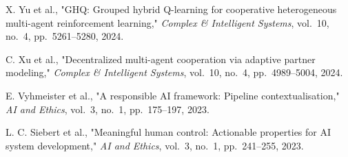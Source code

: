 X. Yu et al., "GHQ: Grouped hybrid Q-learning for cooperative heterogeneous multi-agent reinforcement learning," \textit{Complex \& Intelligent Systems}, vol.~10, no.~4, pp.~5261--5280, 2024.

C. Xu et al., "Decentralized multi-agent cooperation via adaptive partner modeling," \textit{Complex \& Intelligent Systems}, vol.~10, no.~4, pp.~4989--5004, 2024.

E. Vyhmeister et al., "A responsible AI framework: Pipeline contextualisation," \textit{AI and Ethics}, vol.~3, no.~1, pp.~175--197, 2023.

L. C. Siebert et al., "Meaningful human control: Actionable properties for AI system development," \textit{AI and Ethics}, vol.~3, no.~1, pp.~241--255, 2023.
